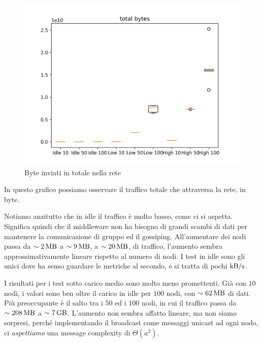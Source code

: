 \documentclass[12pt, a4paper]{article}
\begin{document}
\begin{figure}[H]
    \includegraphics[width=\linewidth]{graphs/total bytes.png}
    \caption{Byte inviati in totale nella rete}
    \label{fig:tb}
\end{figure}

In questo grafico possiamo osservare il traffico totale che attraversa la rete, in byte.

Notiamo anzitutto che in idle il traffico è molto basso, come ci si aspetta. Significa quindi che il middleware non ha bisogno di grandi scambi di dati per mantenere la comunicazione di gruppo ed il gossiping.
All'aumentare dei nodi passa da $\sim\qty{2}{\mega\byte}$ a $\sim\qty{9}{\mega\byte}$, a $\sim\qty{20}{\mega\byte}$, di traffico, l'aumento sembra approssimativamente lineare rispetto al numero di nodi.
I test in idle sono gli unici dove ha senso guardare le metriche al secondo, e si tratta di pochi $\unit{\kilo\byte/\second}$.

I risultati per i test sotto carico medio sono molto meno promettenti. Già con $10$ nodi, i valori sono ben oltre il carico in idle per $100$ nodi, con $\sim\qty{62}{\mega\byte}$ di dati.\\
Più preoccupante è il salto tra i $50$ ed i $100$ nodi, in cui il traffico passa da $\sim\qty{208}{\mega\byte}$ a $\sim\qty{7}{\giga\byte}$. L'aumento non sembra affatto lineare, ma non siamo sorpresi, perché implementando il broadcast come messaggi unicast ad ogni nodo, ci \emph{aspettiamo} una message complexity di $\Theta(a^2)$.
\end{document}
